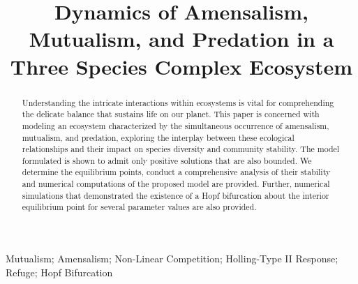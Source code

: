 \documentclass[]{interact}
\theoremstyle{plain}%
\theoremstyle{definition}
\theoremstyle{remark}
\numberwithin{equation}{section}
\begin{document}
\articletype{}%

\title{Dynamics of Amensalism, Mutualism, and Predation in a Three Species Complex Ecosystem}

\author{
}

\maketitle

\begin{abstract}
    Understanding the intricate interactions within ecosystems is vital for comprehending the delicate balance that sustains life on our planet. This paper is concerned with modeling an ecosystem characterized by the simultaneous occurrence of amensalism, mutualism, and predation, exploring the interplay between these ecological relationships and their impact on species diversity and community stability. The model formulated is shown to admit only positive solutions that are also bounded. We determine the equilibrium points, conduct a comprehensive analysis of their stability and numerical computations of the proposed model are provided. Further, numerical simulations that demonstrated the existence of a Hopf bifurcation about the interior equilibrium point for several parameter values are also provided.
\end{abstract}

\begin{keywords}
Mutualism; Amensalism; Non-Linear Competition; Holling-Type II Response; Refuge; Hopf Bifurcation
\end{keywords}









\end{document}

